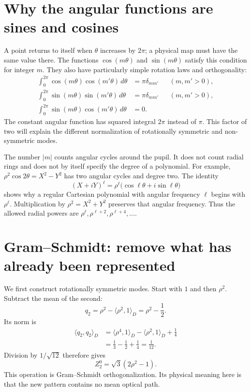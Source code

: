 \section{Why the angular functions are sines and cosines}
A point returns to itself when $\theta$ increases by $2\pi$; a physical
map must have the same value there. The functions $\cos(m\theta)$ and
$\sin(m\theta)$ satisfy this condition for integer $m$. They also have
particularly simple rotation laws and orthogonality:
\begin{align}
 \int_0^{2\pi}\cos(m\theta)\cos(m'\theta)\,d\theta
       &=\pi\delta_{mm'} &&(m,m'>0),\\
 \int_0^{2\pi}\sin(m\theta)\sin(m'\theta)\,d\theta
       &=\pi\delta_{mm'} &&(m,m'>0),\\
 \int_0^{2\pi}\sin(m\theta)\cos(m'\theta)\,d\theta&=0.
\end{align}
The constant angular function has squared integral $2\pi$ instead of
$\pi$. This factor of two will explain the different normalization of
rotationally symmetric and non-symmetric modes.

The number $|m|$ counts angular cycles around the pupil. It does not count
radial rings and does not by itself specify the degree of a polynomial.
For example, $\rho^2\cos2\theta=X^2-Y^2$ has two angular cycles and
degree two. The identity
\begin{equation}
 (X+iY)^\ell=\rho^\ell\bigl(\cos\ell\theta+i\sin\ell\theta\bigr)
\end{equation}
shows why a regular Cartesian polynomial with angular frequency $\ell$
begins with $\rho^\ell$. Multiplication by $\rho^2=X^2+Y^2$ preserves
that angular frequency. Thus the allowed radial powers are
$\rho^\ell,\rho^{\ell+2},\rho^{\ell+4},\ldots$.

\section{Gram--Schmidt: remove what has already been represented}
We first construct rotationally symmetric modes. Start with $1$ and
then $\rho^2$. Subtract the mean of the second:
\begin{equation}
 q_2=\rho^2-\langle\rho^2,1\rangle_D=\rho^2-\frac12.
\end{equation}
Its norm is
\begin{align}
 \langle q_2,q_2\rangle_D
 &=\langle\rho^4,1\rangle_D-\langle\rho^2,1\rangle_D+\frac14\\
 &=\frac13-\frac12+\frac14=\frac1{12}.
\end{align}
Division by $1/\sqrt{12}$ therefore gives
\begin{equation}
 Z_2^0=\sqrt3(2\rho^2-1).
 \label{zc:defocuspoly}
\end{equation}
This operation is Gram--Schmidt orthogonalization. Its physical meaning
here is that the new pattern contains no mean optical path.

